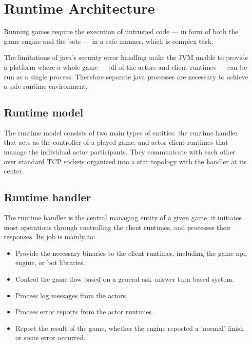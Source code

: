 

%

\chapter{Runtime Architecture}\label{sect:RuntimeArch}

Running games require the execution of untrusted code --- in form of both the game engine and the bots --- in a safe manner, which is complex task.

The limitations of java's security error handling make the JVM unable to provide a platform where a whole game --- all of the actors and client runtimes --- can be run as a single process. Therefore separate java processes are necessary to achieve a safe runtime environment. 

	\section{Runtime model}
	
	The runtime model consists of two main types of entities: the runtime handler that acts as the controller of a played game, and actor client runtimes that manage the individual actor participants.   
	They communicate with each other over standard TCP sockets organized into a star topology with the handler at its center.
	
	\section{Runtime handler}
	
	The runtime handler is the central managing entity of a given game, it initiates most operations through controlling the client runtimes, and processes their responses. Its job is mainly to:
	
	\begin{itemize}
		\item Provide the necessary binaries to the client runtimes, including the game api, engine, or bot libraries.
	
		\item Control the game flow based on a general ask--answer turn based system.
		
		\item Process log messages from the actors.
	
		\item Process error reports from the actor runtimes.
		
		\item Report the result of the game, whether the engine reported a 'normal' finish or some error occurred.  
	\end{itemize}
	
